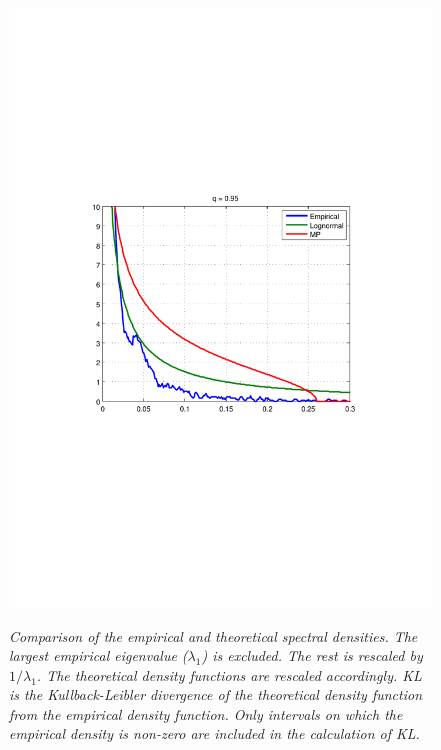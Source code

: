 \documentclass{article}
\begin{document}
\begin{figure}[htb!]
{    \includegraphics[scale=0.33, clip=true, trim=115 271 109
    204]{../pics/spectral_density_q0dot95.pdf}
  }
  \caption{\small \it Comparison of the empirical and theoretical
    spectral densities. The largest empirical eigenvalue ($\lambda_1$)
    is excluded. The rest is rescaled by $1/\lambda_1$. The
    theoretical density functions are rescaled accordingly. KL
    is the Kullback-Leibler divergence of the theoretical density
    function from the empirical density function. Only intervals on
    which the empirical density is non-zero are included in the
    calculation of KL.}
  \label{fig:spectral_density}
\end{figure}
\end{document}
